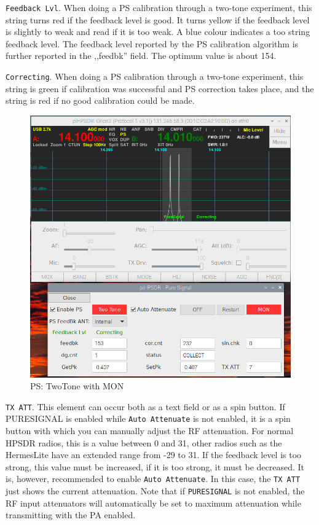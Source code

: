 \documentclass[12pt]{book}
\def\rett#1{\texttt{\color{red}#1}}
\begin{document}
\rett{Feedback Lvl}. When doing a PS calibration through a two-tone experiment, this string
turns red if the feedback level is good. It turns yellow if the feedback level is slightly
to weak and read if it is too weak. A blue colour indicates a too string feedback level.
The feedback level reported by the PS calibration algorithm is further reported in the
,,feedbk'' field. The optimum value is about 154.

\rett{Correcting}. When doing a PS calibration through a two-tone experiment, this string
is green if calibration was successful and PS correction takes place, and the string is
red if no good calibration could be made.

\begin{figure}[t!]
\center
\includegraphics[width=12cm]{PSmon.png}
\caption{PS: TwoTone with MON}
\label{fig:PSmon}
\end{figure}

\rett{TX ATT}. This element can occur both as a text field or as a spin button.
If PURESIGNAL is enabled while \rett{Auto Attenuate} is not enabled, it is a spin button with which
you can manually adjust the RF attenuation. For normal HPSDR radios, this is a value
between 0 and 31, other radios such as the HermesLite have an extended range from
-29 to 31. If the feedback level is too strong, this value must be increased, if it
is too strong, it must be decreased. It is, however, recommended to enable \rett{Auto Attenuate}.
In this case, the \rett{TX ATT} just shows the current attenuation.
Note that if \texttt{PURESIGNAL} is not enabled, the RF input attenuators
will automatically be set to maximum attenuation while transmitting with the PA enabled.
\end{document}
